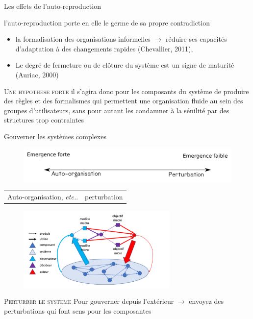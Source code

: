 \documentclass[newPxFont]{beamer}
\begin{document}
\begin{frame}[c]{Les effets de l'auto-reproduction}
\vspace{-1cm}

 l’auto-reproduction porte en elle le germe de sa propre contradiction
 \begin{itemize}
   \item la formalisation des organisations informelles $\rightarrow$ réduire ses capacités d'adaptation à des changements rapides (Chevallier, 2011),
   \item Le degré de fermeture ou de clôture du système est un signe de maturité (Auriac, 2000)
 \end{itemize}


 \small{
   \begin{alertblock}{\textsc{Une hypothese forte}}
     il s’agira donc pour les composants du système de produire des règles et des formalismes qui permettent une organisation fluide au sein des groupes d’utilisateurs, sans pour autant les condamner à la sénilité par des structures trop contraintes
   \end{alertblock}
 }

\end{frame}

\begin{frame}[c]{Gouverner les systèmes complexes}
\vspace{-1cm}

\begin{figure}
  \includegraphics[width=\textwidth]{img/gradiant_emergence.png}
\end{figure}
\vspace{-1cm}
\begin{table}
  \begin{tabular}{c|c}
    Auto-organisation, \textit{etc.}. & perturbation
  \end{tabular}
\end{table}

\begin{figure}
  \includegraphics[width=0.7\textwidth]{img/gouverner.png}
\end{figure}

 \small{
   \begin{alertblock}{\textsc{Perturber le systeme}}
     Pour gouverner depuis l'extérieur $\rightarrow$ envoyez des perturbations qui font sens pour les composantes
   \end{alertblock}
 }
\end{frame}
\end{document}
